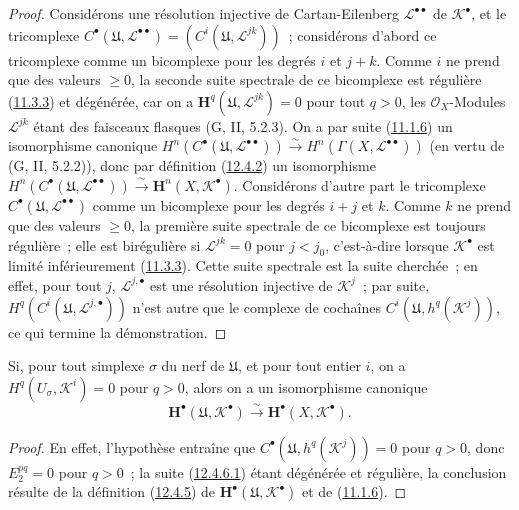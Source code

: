 \begin{proof}
Considérons une résolution injective de Cartan-Eilenberg
$\mathcal L^{\bullet\bullet}$ de $\mathcal K^\bullet$, et le tricomplexe
$C^\bullet(\mathfrak U,\mathcal L^{\bullet\bullet})
=(C^i(\mathfrak U,\mathcal L^{jk}))$~; considérons d'abord ce
tricomplexe comme un bicomplexe pour les degrés $i$ et $j+k$. Comme $i$ ne
prend que des valeurs $\geq0$, la seconde suite spectrale de ce bicomplexe
est régulière (\hyperref[0.11.3.3-fr]{11.3.3}) et dégénérée, car on a
$\mathbf H^q(\mathfrak U,\mathcal L^{jk})=0$ pour tout $q>0$, les
$\mathcal O_X$-Modules $\mathcal L^{jk}$ étant des faisceaux
flasques (G, II, 5.2.3). On a par suite
(\hyperref[0.11.1.6-fr]{11.1.6}) un isomorphisme canonique
$H^n(C^\bullet(\mathfrak U,\mathcal L^{\bullet\bullet}))\xrightarrow{\sim}H^n(\Gamma(X,\mathcal L^{\bullet\bullet}))$
(en vertu de (G, II, 5.2.2)), donc par définition
(\hyperref[0.12.4.2-fr]{12.4.2}) un isomorphisme
$H^n(C^\bullet(\mathfrak U,\mathcal L^{\bullet\bullet}))\xrightarrow{\sim}\mathbf H^n(X,\mathcal K^\bullet)$.
Considérons d'autre part le tricomplexe
$C^\bullet(\mathfrak U,\mathcal L^{\bullet\bullet})$ comme un
bicomplexe pour les degrés $i+j$ et $k$. Comme $k$ ne prend que des valeurs
$\geq0$, la première suite spectrale de ce bicomplexe est toujours
régulière~; elle est birégulière si $\mathcal L^{jk}=0$ pour $j<j_0$,
c'est-à-dire lorsque $\mathcal K^\bullet$ est limité inférieurement
(\hyperref[0.11.3.3-fr]{11.3.3}). Cette suite spectrale est la suite
cherchée~; en effet, pour tout $j$, $\mathcal L^{j,\bullet}$ est une
résolution injective de $\mathcal K^j$~; par suite,
$H^q(C^i(\mathfrak U,\mathcal L^{j,\bullet}))$ n'est autre que le
complexe de cochaînes
$C^i(\mathfrak U,h^q(\mathcal K^j))$, ce qui termine la
démonstration.
\end{proof}

\begin{corollary}[12.4.7]
\label{0.12.4.7-fr}
Si, pour tout simplexe $\sigma$ du nerf de $\mathfrak U$, et pour
tout entier $i$, on a
$H^q(U_\sigma,\mathcal K^i)=0$ pour $q>0$, alors on a un isomorphisme
canonique
\begin{equation}
\label{0.12.4.7.1-fr}
\tag{12.4.7.1}
\mathbf H^\bullet(\mathfrak U,\mathcal K^\bullet)
\xrightarrow{\sim}\mathbf H^\bullet(X,\mathcal K^\bullet).
\end{equation}
\end{corollary}

\begin{proof}
En effet, l'hypothèse entraîne que
$C^\bullet(\mathfrak U,h^q(\mathcal K^j))=0$ pour $q>0$, donc
$E_2^{pq}=0$ pour $q>0$~; la suite
(\hyperref[0.12.4.6.1-fr]{12.4.6.1}) étant dégénérée et régulière, la
conclusion résulte de la définition
(\hyperref[0.12.4.5-fr]{12.4.5}) de
$\mathbf H^\bullet(\mathfrak U,\mathcal K^\bullet)$ et de
(\hyperref[0.11.1.6-fr]{11.1.6}).
\end{proof}

